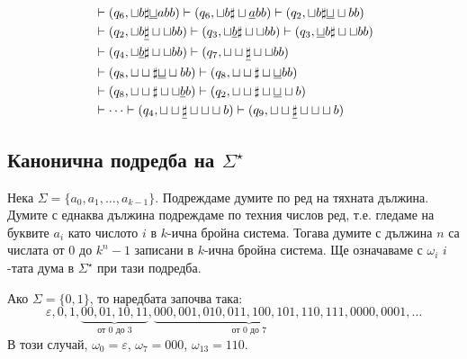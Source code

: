 \begin{example}
\begin{align*}
                                     & \vdash (q_6, \sqcup b \sharp \underline{\sqcup} abb) \vdash (q_6, \sqcup b \sharp \sqcup \underline{a}bb) \vdash (q_2, \sqcup b \sharp \underline{\sqcup}\sqcup bb)\\
                                     & \vdash (q_2, \sqcup b \underline{\sharp} \sqcup\sqcup bb) \vdash (q_3, \sqcup \underline{b} \sharp \sqcup\sqcup bb) \vdash (q_3, \underline{\sqcup} b \sharp \sqcup\sqcup bb)\\
                                     & \vdash (q_4,  \sqcup \underline{b} \sharp \sqcup\sqcup bb) \vdash (q_7, \sqcup \sqcup \underline{\sharp} \sqcup\sqcup bb) \\
                                     & \vdash (q_8, \sqcup \sqcup \sharp \underline{\sqcup}\sqcup bb) \vdash (q_8, \sqcup \sqcup \sharp \sqcup \underline{\sqcup} bb) \\
                                     & \vdash (q_8, \sqcup \sqcup \sharp \sqcup \sqcup \underline{b}b) \vdash (q_2, \sqcup \sqcup \sharp \sqcup \underline{\sqcup} \sqcup b)\\
                                     & \vdash \cdots \vdash (q_4, \sqcup\sqcup\underline{\sharp}\sqcup\sqcup\sqcup b) \vdash (q_9, \sqcup\sqcup\underline{\sharp}\sqcup\sqcup\sqcup b)
  \end{align*}
\end{example}

\subsection*{Канонична подредба на $\Sigma^\star$}

Нека $\Sigma = \{a_0,a_1,\dots,a_{k-1}\}$.
Подреждаме думите по ред на тяхната дължина.
Думите с еднаква дължина подреждаме по техния числов ред, т.е.
гледаме на буквите $a_i$ като числото $i$ в $k$-ична бройна система.
Тогава думите с дължина $n$ са числата от $0$ до $k^n-1$ записани в $k$-ична бройна система.
Ще означаваме с $\omega_i$ $i$-тата дума в $\Sigma^\star$ при тази подредба.

\begin{example}
  Ако $\Sigma = \{0,1\}$, то наредбата започва така:
  \[\varepsilon, 0, 1, \underbrace{00, 01, 10, 11}_{\text{от $0$ до $3$}}, \underbrace{000, 001, 010, 011, 100, 101, 110, 111}_{\text{от $0$ до $7$}}, 0000, 0001, \dots\]
  В този случай, $\omega_0 = \varepsilon$, $\omega_7 = 000$, $\omega_{13} = 110$.
\end{example}

